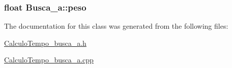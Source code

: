 \subsubsection[{\texorpdfstring{peso}{peso}}]{\setlength{\rightskip}{0pt plus 5cm}float Busca\+\_\+a\+::peso}\hypertarget{classBusca__a_abfc5d1b31430b3aa91439ee44468e0e6}{}\label{classBusca__a_abfc5d1b31430b3aa91439ee44468e0e6}


The documentation for this class was generated from the following files\+:\begin{DoxyCompactItemize}
\item 
\hyperlink{CalculoTempo__busca__a_8h}{Calculo\+Tempo\+\_\+busca\+\_\+a.\+h}\item 
\hyperlink{CalculoTempo__busca__a_8cpp}{Calculo\+Tempo\+\_\+busca\+\_\+a.\+cpp}\end{DoxyCompactItemize}

